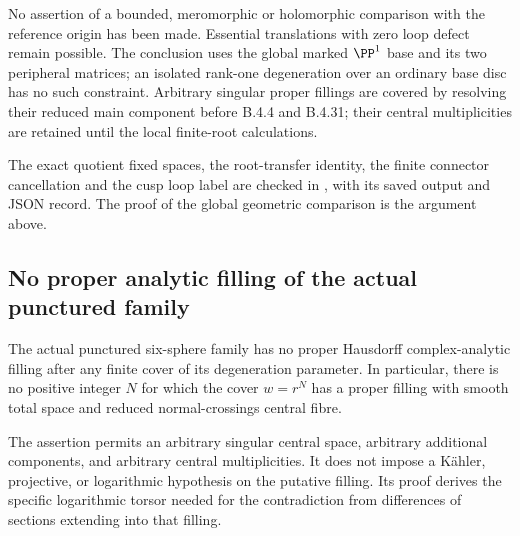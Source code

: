 \begin{remark}
No assertion of a bounded, meromorphic or holomorphic
comparison with the reference origin has been made.
Essential translations with zero loop defect remain
possible. The conclusion uses the global marked
$\PP^1$ base and its two peripheral matrices; an isolated
rank-one degeneration over an ordinary base disc has
no such constraint. Arbitrary singular proper fillings
are covered by resolving their reduced main component
before B.4.4 and B.4.31; their central multiplicities
are retained until the local finite-root calculations.
\end{remark}

The exact quotient fixed spaces, the root-transfer identity,
the finite connector cancellation and the cusp loop label
are checked in
, with its saved
output and JSON record. The proof of the global geometric
comparison is the argument above.

\subsection{No proper analytic filling of the actual punctured family}

\begin{theorem}\label{push:src:B.4.33}
\label{push:B433}
The actual punctured six-sphere family has no proper
Hausdorff complex-analytic filling after any finite
cover of its degeneration parameter. In particular,
there is no positive integer $N$ for which the cover
$w=r^N$ has a proper filling with smooth total space
and reduced normal-crossings central fibre.

The assertion permits an arbitrary singular central
space, arbitrary additional components, and arbitrary
central multiplicities. It does not impose a
K\"ahler, projective, or logarithmic hypothesis on
the putative filling. Its proof derives the specific
logarithmic torsor needed for the contradiction from
differences of sections extending into that filling.
\end{theorem}

